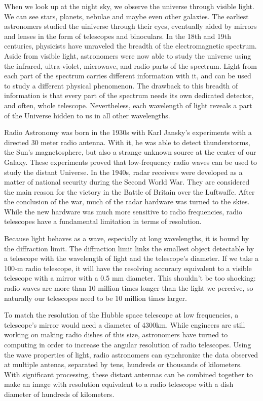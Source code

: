 When we look up at the night sky, we observe the universe through visible light. We can see stars, planets, nebulae and maybe even other galaxies. The earliest astronomers studied the uiniverse through their eyes, eventually aided by mirrors and lenses in the form of telescopes and binoculars. In the 18th and 19th centuries, physicists have unraveled the breadth of the electromagnetic spectrum. Aside from visible light, astronomers were now able to study the universe using the infrared, ultra-violet, microwave, and radio parts of the spectrum. Light from each part of the spectrum carries different information with it, and can be used to study a different physical phenomenon. The drawback to this breadth of information is that every part of the spectrum needs its own dedicated detector, and often, whole telescope. Nevertheless, each wavelength of light reveals a part of the Universe hidden to us in all other wavelengths. 

Radio Astronomy was born in the 1930s with Karl Jansky's experiments with a directed 30 meter radio antenna. With it, he was able to detect thunderstorms, the Sun's magnetosphere, but also a strange unknown source at the center of our Galaxy. These experiments proved that low-frequency radio waves can be used to study the distant Universe. In the 1940s, radar receivers were developed as a matter of national security during the Second World War. They are considered the main reason for the victory in the Battle of Britain over the Luftwaffe. After the conclusion of the war, much of the radar hardware was turned to the skies. While the new hardware was much more sensitive to radio frequencies, radio telescopes have a fundamental limitation in terms of resolution. 

Because light behaves as a wave, especially at long wavelengths, it is bound by the diffraction limit. The diffraction limit links the smallest object detectable by a telescope with the wavelength of light and the telescope's diameter. If we take a 100-m radio telescope, it will have the resolving accuracy equivalent to a visible telescope with a mirror with a 0.5 mm diameter. This shouldn't be too shocking: radio waves are more than 10 million times longer than the light we perceive, so naturally our telescopes need to be 10 million times larger. 

To match the resolution of the Hubble space telescope at low frequencies, a telescope's mirror would need a diameter of 4300km. While engineers are still working on making radio dishes of this size, astronomers have turned to computing in order to increase the angular resolution of radio telescopes. Using the wave properties of light, radio astronomers can synchronize the data observed at multiple antenas, separated by tens, hundreds or thousands of kilometers. With significant processing, these distant antennas can be combined together to make an image with resolution equivalent to a radio telescope with a dish diameter of hundreds of kilometers. 

